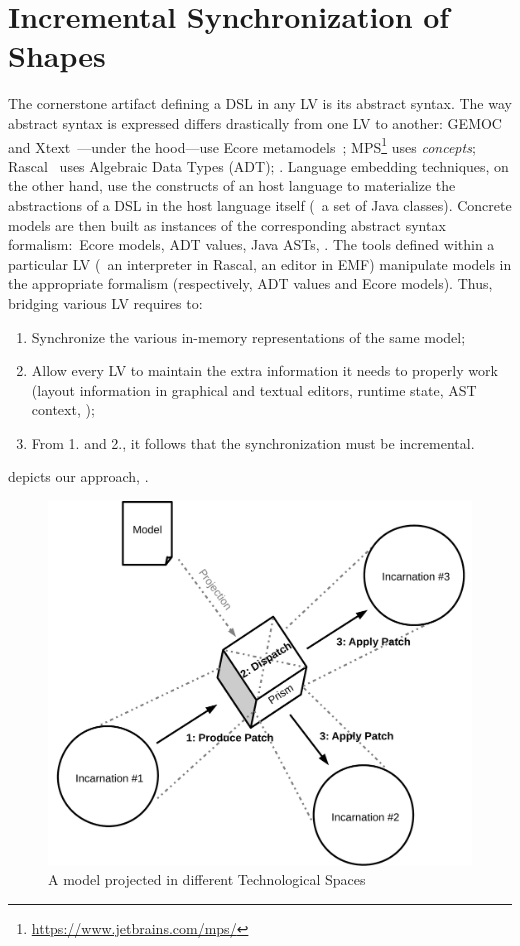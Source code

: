 \section{Incremental Synchronization of Shapes}


The cornerstone artifact defining a DSL in any LV is its abstract syntax.
The way abstract syntax is expressed differs drastically from one LV to another: GEMOC~\cite{bousse2016execution} and Xtext~\cite{bettini2016implementing}---under the hood---use Ecore metamodels~\cite{steinberg2008emf}; MPS\footnote{\url{https://www.jetbrains.com/mps/}} uses \emph{concepts}; Rascal~\cite{klint2010easy} uses Algebraic Data Types (ADT); \etc.
Language embedding techniques, on the other hand, use the constructs of an host language to materialize the abstractions of a DSL in the host language itself (\eg~a set of Java classes).
Concrete models are then built as instances of the corresponding abstract syntax formalism:~Ecore models, ADT values, Java ASTs, \etc.
The tools defined within a particular LV (\eg~an interpreter in Rascal, an editor in EMF) manipulate models in the appropriate formalism (respectively, ADT values and Ecore models).
Thus, bridging various LV requires to:
\begin{enumerate}
	\item Synchronize the various in-memory representations of the same model;
	\item Allow every LV to maintain the extra information it needs to properly work (layout information in graphical and textual editors, runtime state, AST context, \etc);
	\item From 1. and 2., it follows that the synchronization must be incremental.
\end{enumerate}

 depicts our approach, \prism.

\begin{figure}
	\centering
	\includegraphics[width=.6\columnwidth]{figures/prism}
	\caption{A model projected in different Technological Spaces}
	\label{fig:prism}
\end{figure}

